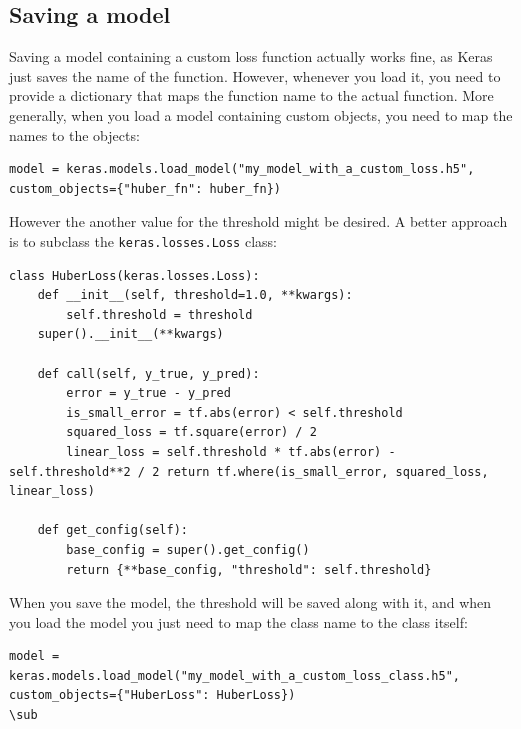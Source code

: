 \documentclass[12pt, letterpaper]{article}
\theoremstyle{definition}
\let\cd\lstinline
\begin{document}
\subsection{Saving a model}
Saving a model containing a custom loss function actually works fine, as Keras just saves the name of the function. However, whenever you load it, you need to provide a dictionary that maps the function name to the actual function. More generally, when you load a model containing custom objects, you need to map the names to the objects:
\begin{lstlisting}
model = keras.models.load_model("my_model_with_a_custom_loss.h5", custom_objects={"huber_fn": huber_fn})
\end{lstlisting}
However the another value for the threshold might be desired. A better approach is to subclass the \cd+keras.losses.Loss+ class:
\begin{lstlisting}
class HuberLoss(keras.losses.Loss):
	def __init__(self, threshold=1.0, **kwargs):
    	self.threshold = threshold
	super().__init__(**kwargs) 
	
	def call(self, y_true, y_pred):
		error = y_true - y_pred
		is_small_error = tf.abs(error) < self.threshold
		squared_loss = tf.square(error) / 2
		linear_loss = self.threshold * tf.abs(error) - self.threshold**2 / 2 return tf.where(is_small_error, squared_loss, linear_loss)
	
	def get_config(self):
		base_config = super().get_config()
		return {**base_config, "threshold": self.threshold}
\end{lstlisting}
When you save the model, the threshold will be saved along with it, and when you load the model you just need to map the class name to the class itself:
\begin{lstlisting}
model = keras.models.load_model("my_model_with_a_custom_loss_class.h5", custom_objects={"HuberLoss": HuberLoss})
\sub
\end{lstlisting}
\end{document}
